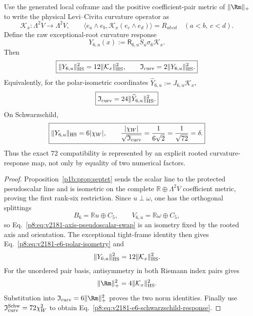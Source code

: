 \documentclass[12pt,a4paper]{article}
\begin{document}
\begin{theorem}
Use the generated local coframe and the positive coefficient-pair metric of
\(\lVert\Rm\rVert_+\) to write the physical Levi--Civita curvature operator
as
\[
 \mathcal K_x:\Lambda^2V\longrightarrow\Lambda^2V,
 \qquad
 \langle e_a\wedge e_b,\mathcal K_x(e_c\wedge e_d)\rangle
 =R_{ab\,cd}\quad(a<b,\ c<d).
\]
Define the raw exceptional-root curvature response
\begin{equation}
\label{p8:eq:v2181-e6-raw-curvature-response}
 \boxed{
 Y_{6,u}(x):=\mathsf R_{6,u}S_u\sigma_6\mathcal K_x.}
\end{equation}
Then
\begin{equation}
\label{p8:eq:v2181-e6-curvature-response-norm}
 \boxed{
 \|Y_{6,u}\|_{\rm HS}^2
 =12\|\mathcal K_x\|_{\rm HS}^2,\qquad
 \mathfrak I_{\rm curv}=2\|Y_{6,u}\|_{\rm HS}^2.}
\end{equation}
Equivalently, for the polar-isometric coordinates
\(\widehat Y_{6,u}:=J_{6,u}\mathcal K_x\),
\begin{equation}
\label{p8:eq:v2181-e6-polar-curvature-norm}
 \boxed{
 \mathfrak I_{\rm curv}=24\|\widehat Y_{6,u}\|_{\rm HS}^2.}
\end{equation}
On Schwarzschild,
\begin{equation}
\label{p8:eq:v2181-e6-schwarzschild-response}
 \boxed{
 \|Y_{6,u}\|_{\rm HS}=6|\chi_W|,\qquad
 \frac{|\chi_W|}{\sqrt{\mathfrak I_{\rm curv}}}
 =\frac1{6\sqrt2}=\frac1{\sqrt{72}}=\delta.}
\end{equation}
Thus the exact \(72\) compatibility is represented by an explicit rooted
curvature-response map, not only by equality of two numerical factors.
\end{theorem}

\begin{proof}
Proposition~\ref{p1b:prop:septet} sends the scalar line to the protected
pseudoscalar line and is isometric on the complete
\(\mathbb R\oplus\Lambda^2V\) coefficient metric, proving the first
rank-six restriction.  Since \(u\perp\omega\), one has the orthogonal
splittings
\[
 B_6=\mathbb Ru\oplus C_5,
 \qquad
 V_{6,u}=\mathbb R\omega\oplus C_5,
\]
so Eq.~\eqref{p8:eq:v2181-axis-pseudoscalar-swap} is an isometry fixed by the
rooted axis and orientation.  The exceptional tight-frame identity then gives
Eq.~\eqref{p8:eq:v2181-e6-polar-isometry} and
\[
 \|Y_{6,u}\|_{\rm HS}^2
 =12\|\mathcal K_x\|_{\rm HS}^2.
\]
For the unordered pair basis, antisymmetry in both Riemann index pairs gives
\[
 \|\Rm\|_+^2=4\|\mathcal K_x\|_{\rm HS}^2.
\]
Substitution into
\(\mathfrak I_{\rm curv}=6\|\Rm\|_+^2\) proves the two norm identities.
Finally use
\(\mathfrak I_{\rm curv}^{\rm Schw}=72\chi_W^2\) to obtain
Eq.~\eqref{p8:eq:v2181-e6-schwarzschild-response}.
\end{proof}
\end{document}

